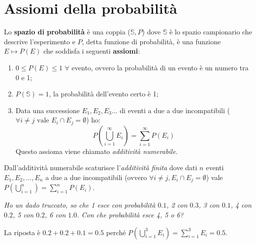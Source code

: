 \section{Assiomi della probabilità}
\begin{redbar}
    Lo \textbf{spazio di probabilità} è una coppia ($\mathbb{S}, P$) dove $\mathbb{S}$ è lo spazio campionario che descrive l'esperimento e $P$, detta funzione di probabilità, è una funzione $E\longmapsto P(E)$ che soddisfa i seguenti \textbf{assiomi}:
    \begin{enumerate}
        \item $0\leq P(E)\leq 1$ $\forall$ evento, ovvero la probabilità di un evento è un numero tra 0 e 1;
        \item $P(\mathbb{S})=1$, la probabilità dell'evento certo è 1;
        \item Data una successione $E_1, E_2, E_3 ...$ di eventi a due a due incompatibili ($\forall i\neq j \mbox{ vale } E_i\cap E_j=\emptyset$) ho:
        \begin{equation*}
            P(\bigcup^\infty_{i=1}E_i)=\sum^\infty_{i=1}P(E_i)
        \end{equation*}
        Questo assioma viene chiamato \textit{additività numerabile}.
    \end{enumerate}
\end{redbar}

Dall'additività numerabile scaturisce l'\textit{additività finita} dove dati $n$ eventi $E_1, E_2, ..., E_n$ a due a due incompatibili (ovvero $\forall i\neq j, E_i\cap E_j=\emptyset$) vale $P(\bigcup^n_{i=1})=\sum^n_{i=1}P(E_i)$.

\begin{Example}{}{}
    \textit{Ho un dado truccato, so che 1 esce con probabilità $0.1$, 2 con $0.3$, 3 con $0.1$, 4 con $0.2$, 5 con $0.2$, 6 con $1.0$. Con che probabilità esce 4, 5 o 6?} 
    
    La riposta è $0.2+0.2+0.1=0.5$ perché $P(\bigcup^3_{i=1}E_i)=\sum^3_{i=1}E_i=0.5$.
\end{Example}

